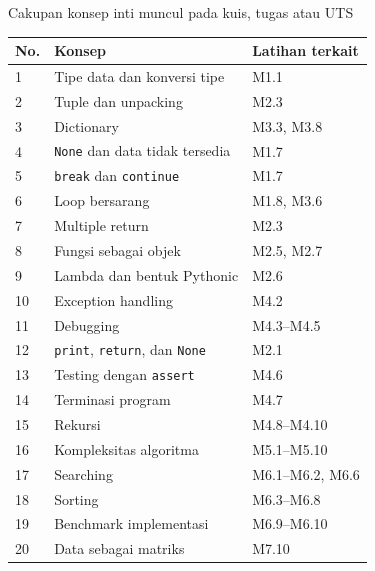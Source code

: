 \documentclass[9pt,a4paper]{article}
\begin{document}
\begin{conceptbox}{Cakupan konsep inti muncul pada kuis, tugas atau UTS}
\small
\begin{tabularx}{\linewidth}{@{}p{.08\linewidth}X p{.23\linewidth}@{}}
\toprule
\textbf{No.} & \textbf{Konsep} & \textbf{Latihan terkait}\\
\midrule
1 & Tipe data dan konversi tipe & M1.1\\
2 & Tuple dan unpacking & M2.3\\
3 & Dictionary & M3.3, M3.8\\
4 & \texttt{None} dan data tidak tersedia & M1.7\\
5 & \texttt{break} dan \texttt{continue} & M1.7\\
6 & Loop bersarang & M1.8, M3.6\\
7 & Multiple return & M2.3\\
8 & Fungsi sebagai objek & M2.5, M2.7\\
9 & Lambda dan bentuk Pythonic & M2.6\\
10 & Exception handling & M4.2\\
11 & Debugging & M4.3--M4.5\\
12 & \texttt{print}, \texttt{return}, dan \texttt{None} & M2.1\\
13 & Testing dengan \texttt{assert} & M4.6\\
14 & Terminasi program & M4.7\\
15 & Rekursi & M4.8--M4.10\\
16 & Kompleksitas algoritma & M5.1--M5.10\\
17 & Searching & M6.1--M6.2, M6.6\\
18 & Sorting & M6.3--M6.8\\
19 & Benchmark implementasi & M6.9--M6.10\\
20 & Data sebagai matriks & M7.10\\
\bottomrule
\end{tabularx}
\end{conceptbox}
\end{document}
